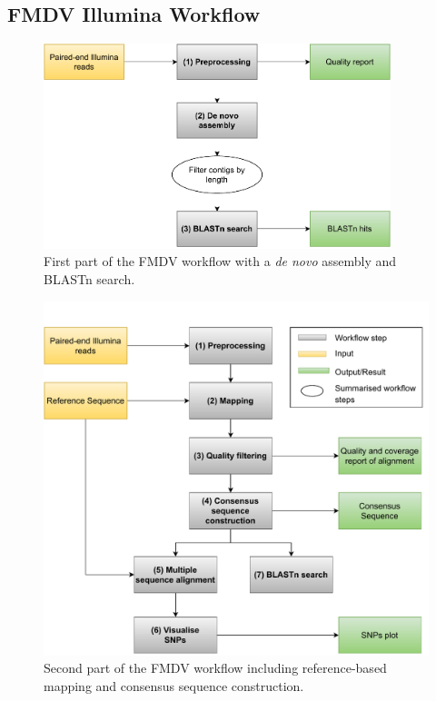 \subsection{FMDV Illumina Workflow}\label{sec:fmdv-wf}
\begin{figure}[ht!]
	\centering
	\includegraphics[width=0.9\textwidth]{media/3-fmdv-1-2.pdf}
	\caption{First part of the \ac{FMDV} workflow with a \textit{de novo} assembly and \ac{BLAST}n search.}
	\label{fig:3-fmdv-wf-1}
\end{figure}
\begin{figure}[ht!]
	\centering
	\includegraphics[width=1\textwidth]{media/3-fmdv-2-2.pdf}
	\caption{Second part of the \ac{FMDV} workflow including reference-based mapping and consensus sequence construction.}
	\label{fig:3-fmdv-wf-2}
\end{figure}

